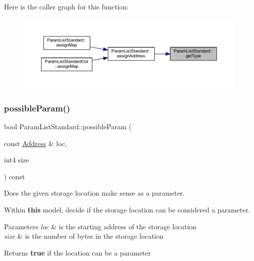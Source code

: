 Here is the caller graph for this function\+:
\nopagebreak
\begin{figure}[H]
\begin{center}
\leavevmode
\includegraphics[width=350pt]{class_param_list_standard_a37193293ffb24b1206944e35ef64973c_icgraph}
\end{center}
\end{figure}
\mbox{\label{class_param_list_standard_a22a2afd938c503357fac9d330eb89858}} 
\subsubsection{\texorpdfstring{possibleParam()}{possibleParam()}}
{\footnotesize\ttfamily bool Param\+List\+Standard\+::possible\+Param (\begin{DoxyParamCaption}\item[{const \mbox{\hyperlink{class_address}{Address}} \&}]{loc,  }\item[{int4}]{size }\end{DoxyParamCaption}) const\hspace{0.3cm}{\ttfamily [virtual]}}



Does the given storage location make sense as a parameter. 

Within {\bfseries{this}} model, decide if the storage location can be considered a parameter. 
\begin{DoxyParams}{Parameters}
{\em loc} & is the starting address of the storage location \\
\hline
{\em size} & is the number of bytes in the storage location \\
\hline
\end{DoxyParams}
\begin{DoxyReturn}{Returns}
{\bfseries{true}} if the location can be a parameter 
\end{DoxyReturn}


